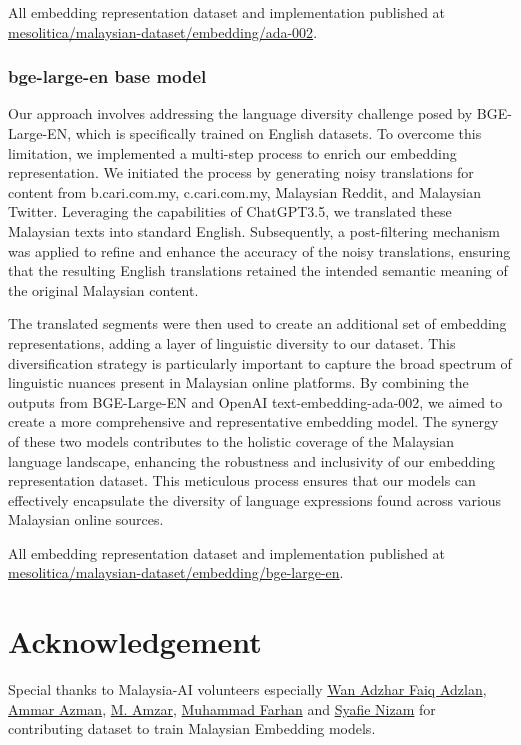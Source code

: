 \documentclass[preprint]{article}
\begin{document}
All embedding representation dataset and implementation published at \href{https://github.com/mesolitica/malaysian-dataset/tree/master/embedding/ada-002}{mesolitica/malaysian-dataset/embedding/ada-002}.

\subsubsection{bge-large-en base model}

Our approach involves addressing the language diversity challenge posed by BGE-Large-EN, which is specifically trained on English datasets. To overcome this limitation, we implemented a multi-step process to enrich our embedding representation. We initiated the process by generating noisy translations for content from b.cari.com.my, c.cari.com.my, Malaysian Reddit, and Malaysian Twitter. Leveraging the capabilities of ChatGPT3.5, we translated these Malaysian texts into standard English. Subsequently, a post-filtering mechanism was applied to refine and enhance the accuracy of the noisy translations, ensuring that the resulting English translations retained the intended semantic meaning of the original Malaysian content.

The translated segments were then used to create an additional set of embedding representations, adding a layer of linguistic diversity to our dataset. This diversification strategy is particularly important to capture the broad spectrum of linguistic nuances present in Malaysian online platforms. By combining the outputs from BGE-Large-EN and OpenAI text-embedding-ada-002, we aimed to create a more comprehensive and representative embedding model. The synergy of these two models contributes to the holistic coverage of the Malaysian language landscape, enhancing the robustness and inclusivity of our embedding representation dataset. This meticulous process ensures that our models can effectively encapsulate the diversity of language expressions found across various Malaysian online sources.

All embedding representation dataset and implementation published at \href{https://github.com/mesolitica/malaysian-dataset/tree/master/embedding/bge-large-en}{mesolitica/malaysian-dataset/embedding/bge-large-en}.

\section{Acknowledgement}

Special thanks to Malaysia-AI volunteers especially \href{https://www.linkedin.com/in/wan-adzhar-faiq-adzlan-19a27baa/}{Wan Adzhar Faiq Adzlan}, \href{https://www.linkedin.com/in/ammar-azman/}{Ammar Azman}, \href{https://www.linkedin.com/in/amzar96/}{M. Amzar}, \href{https://www.linkedin.com/in/muhammad-farhan-helmy-0529501a7/}{Muhammad Farhan} and \href{https://www.linkedin.com/in/syafie-nizam/}{Syafie Nizam} for contributing dataset to train Malaysian Embedding models.
\end{document}
